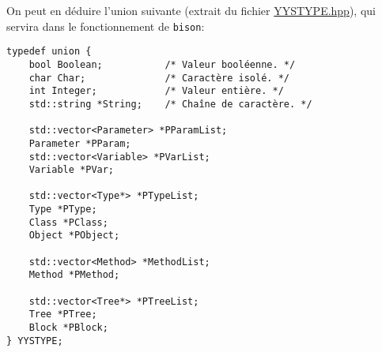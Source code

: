 \documentclass[12pt,a4paper]{article}
\begin{document}
On peut en déduire l'{\color{blue}union} suivante (extrait du fichier \href{../YYSTYPE.hpp}{\ttfamily YYSTYPE.hpp}), qui servira dans le fonctionnement de \texttt{bison}:

\begin{lstlisting}
typedef union {
	bool Boolean;			/* Valeur booléenne. */
	char Char;				/* Caractère isolé. */
	int Integer;			/* Valeur entière. */
	std::string *String;	/* Chaîne de caractère. */
	
	std::vector<Parameter> *PParamList;
	Parameter *PParam;
	std::vector<Variable> *PVarList;
	Variable *PVar;
	
	std::vector<Type*> *PTypeList;
	Type *PType;
	Class *PClass;
	Object *PObject;
	
	std::vector<Method> *MethodList;
	Method *PMethod;
	
	std::vector<Tree*> *PTreeList;
	Tree *PTree;
	Block *PBlock;
} YYSTYPE;
\end{lstlisting}
\end{document}

